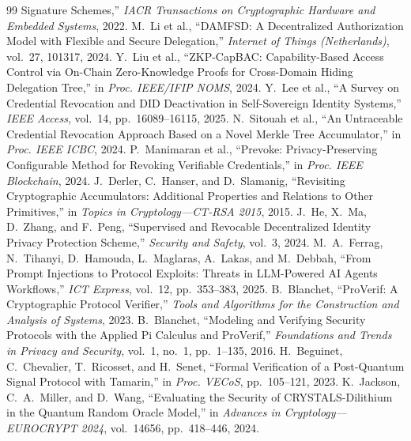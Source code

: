 \documentclass[10pt,twocolumn]{IEEEtran}
\begin{document}
\begin{appendices}
\begin{thebibliography}{99}
    Signature Schemes,''
    \emph{IACR Transactions on Cryptographic Hardware and Embedded Systems}, 2022.
   M.~Li et al., ``DAMFSD: A Decentralized Authorization
    Model with Flexible and Secure Delegation,'' \emph{Internet of Things (Netherlands)},
    vol.~27, 101317, 2024.
   Y.~Liu et al., ``ZKP-CapBAC: Capability-Based Access Control
    via On-Chain Zero-Knowledge Proofs for Cross-Domain Hiding Delegation Tree,'' in
    \emph{Proc. IEEE/IFIP NOMS}, 2024.
   Y.~Lee et al., ``A Survey on Credential Revocation and DID
    Deactivation in Self-Sovereign Identity Systems,'' \emph{IEEE Access}, vol.~14,
    pp.~16089--16115, 2025.
   N.~Sitouah et al., ``An Untraceable Credential Revocation
    Approach Based on a Novel Merkle Tree Accumulator,'' in \emph{Proc. IEEE ICBC}, 2024.
   P.~Manimaran et al., ``Prevoke: Privacy-Preserving Configurable Method
    for Revoking Verifiable Credentials,'' in \emph{Proc. IEEE Blockchain}, 2024.
   J.~Derler, C.~Hanser, and D.~Slamanig,
    ``Revisiting Cryptographic Accumulators: Additional Properties and Relations to
    Other Primitives,'' in \emph{Topics in Cryptology---CT-RSA 2015}, 2015.
   J.~He, X.~Ma, D.~Zhang, and F.~Peng, ``Supervised
    and Revocable Decentralized Identity Privacy Protection Scheme,'' \emph{Security
    and Safety}, vol.~3, 2024.
   M.~A.~Ferrag, N.~Tihanyi, D.~Hamouda,
    L.~Maglaras, A.~Lakas, and M.~Debbah, ``From Prompt Injections to Protocol
    Exploits: Threats in LLM-Powered AI Agents Workflows,'' \emph{ICT Express},
    vol.~12, pp.~353--383, 2025.
   B.~Blanchet, ``ProVerif: A Cryptographic Protocol Verifier,''
    \emph{Tools and Algorithms for the Construction and Analysis of Systems}, 2023.
   B.~Blanchet, ``Modeling and Verifying Security
    Protocols with the Applied Pi Calculus and ProVerif,'' \emph{Foundations and
    Trends in Privacy and Security}, vol.~1, no.~1, pp.~1--135, 2016.
   H.~Beguinet, C.~Chevalier, T.~Ricosset, and
    H.~Senet, ``Formal Verification of a Post-Quantum Signal Protocol with Tamarin,''
    in \emph{Proc. VECoS}, pp.~105--121, 2023.
   K.~Jackson, C.~A.~Miller, and D.~Wang, ``Evaluating the
    Security of CRYSTALS-Dilithium in the Quantum Random Oracle Model,'' in
    \emph{Advances in Cryptology---EUROCRYPT 2024}, vol.~14656, pp.~418--446, 2024.

\end{thebibliography}
\end{appendices}
\end{document}
